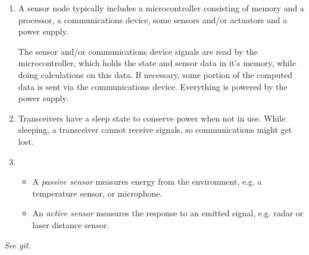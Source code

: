 

\date{Monday, 25.05.2020}


    \maketitle
    \thispagestyle{fancy}

    \begin{enumerate}
        \item A sensor node typically includes a microcontroller consisting of memory and a processor, a communications device, some sensors and/or actuators and a power supply.
        
        The sensor and/or communications device signals are read by the microcontroller, which holds the state and sensor data in it's memory, while doing calculations on this data. If necessary, some portion of the computed data is sent via the communications device. Everything is powered by the power supply. 

        \item Transceivers have a sleep state to conserve power when not in use. While sleeping, a transceiver cannot receive signals, so communications might get lost.
        \item 
        \begin{itemize} 
            \item A \emph{passive sensor} measures energy from the environment, e.g. a temperature sensor, or microphone.
            \item An \emph{active sensor} measures the response to an emitted signal, e.g. radar or laser distance sensor.
        \end{itemize}
    \end{enumerate}


    \textit{See git.}

    
